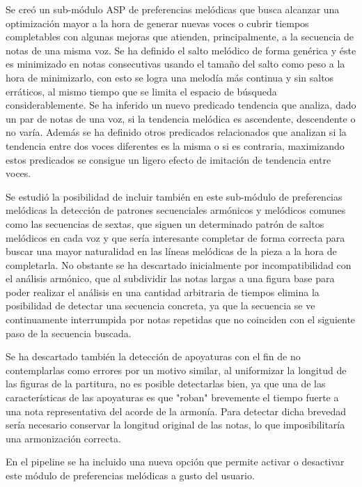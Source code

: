 Se creó un sub-módulo ASP de preferencias melódicas que busca alcanzar una optimización mayor a la hora de generar nuevas voces o cubrir tiempos completables con algunas mejoras que atienden, principalmente, a la secuencia de notas de una misma voz. Se ha definido el salto melódico de forma genérica y éste es minimizado en notas consecutivas usando el tamaño del salto como peso a la hora de minimizarlo, con esto se logra una melodía más continua y sin saltos erráticos, al mismo tiempo que se limita el espacio de búsqueda considerablemente. Se ha inferido un nuevo predicado tendencia que analiza, dado un par de notas de una voz, si la tendencia melódica es ascendente, descendente o no varía. Además se ha definido otros predicados relacionados que analizan si la tendencia entre dos voces diferentes es la misma o si es contraria, maximizando estos predicados se consigue un ligero efecto de imitación de tendencia entre voces.

Se estudió la posibilidad de incluir también en este sub-módulo de preferencias melódicas la detección de patrones secuenciales armónicos y melódicos comunes como las secuencias de sextas, que siguen un determinado patrón de saltos melódicos en cada voz y que sería interesante completar de forma correcta para buscar una mayor naturalidad en las líneas melódicas de la pieza a la hora de completarla. No obstante se ha descartado inicialmente por incompatibilidad con el análisis armónico, que al subdividir las notas largas a una figura base para poder realizar el análisis en una cantidad arbitraria de tiempos elimina la posibilidad de detectar una secuencia concreta, ya que la secuencia se ve continuamente interrumpida por notas repetidas que no coinciden con el siguiente paso de la secuencia buscada.

Se ha descartado también la detección de apoyaturas con el fin de no contemplarlas como errores por un motivo similar, al uniformizar la longitud de las figuras de la partitura, no es posible detectarlas bien, ya que una de las características de las apoyaturas es que "roban" brevemente el tiempo fuerte a una nota representativa del acorde de la armonía. Para detectar dicha brevedad sería necesario conservar la longitud original de las notas, lo que imposibilitaría una armonización correcta.

En el pipeline se ha incluido una nueva opción que permite activar o desactivar este módulo de preferencias melódicas a gusto del usuario.

